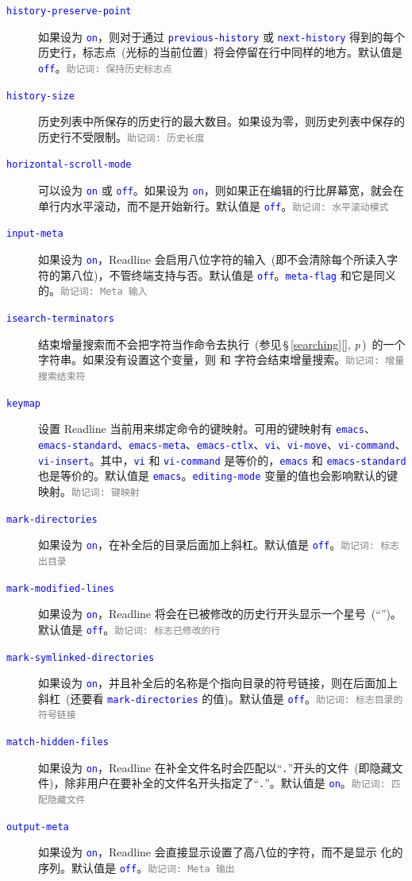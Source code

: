 \documentclass[openany,notitlepage]{book}
\newcommand{\mnemonic}[1]{\textcolor{gray}{{\scriptsize\tt 助记词: #1}}}
\newcommand{\code}[1]{\textcolor{blue}{{\tt #1}}}
\newcommand{\fullref}[1]{\,\S\,\ref{#1}[\nameref{#1}], \textit{p\pageref{#1}}\,}
\begin{document}
\begin{CJK}{UTF8}{song}
\begin{description}
\item[\code{history-preserve-point}] 如果设为 \code{on}，则对于通过 \code{previous-history} 或 \code{next-history} 得到的每个历史行，标志点~(光标的当前位置)~将会停留在行中同样的地方。默认值是 \code{off}。\mnemonic{保持历史标志点}
\item[\code{history-size}] 历史列表中所保存的历史行的最大数目。如果设为零，则历史列表中保存的历史行不受限制。\mnemonic{历史长度}
\item[\code{horizontal-scroll-mode}] 可以设为 \code{on} 或 \code{off}。如果设为 \code{on}，则如果正在编辑的行比屏幕宽，就会在单行内水平滚动，而不是开始新行。默认值是 \code{off}。\mnemonic{水平滚动模式}
\item[\code{input-meta}] 如果设为 \code{on}，Readline 会启用八位字符的输入~(即不会清除每个所读入字符的第八位)，不管终端支持与否。默认值是 \code{off}。\code{meta-flag} 和它是同义的。\mnemonic{Meta 输入}
\item[\code{isearch-terminators}] 结束增量搜索而不会把字符当作命令去执行~(参见\fullref{searching})~的一个字符串。如果没有设置这个变量，则  和  字符会结束增量搜索。\mnemonic{增量搜索结束符}
\item[\code{keymap}] 设置 Readline 当前用来绑定命令的键映射。可用的键映射有 \code{emacs}、\code{emacs-standard}、\code{emacs-meta}、\code{emacs-ctlx}、\code{vi}、\code{vi-move}、\code{vi-command}、\code{vi-insert}。其中，\code{vi} 和 \code{vi-command} 是等价的，\code{emacs} 和 \code{emacs-standard} 也是等价的。默认值是 \code{emacs}。\code{editing-mode} 变量的值也会影响默认的键映射。\mnemonic{键映射}
\item[\code{mark-directories}] 如果设为 \code{on}，在补全后的目录后面加上斜杠。默认值是 \code{off}。\mnemonic{标志出目录}
\item[\code{mark-modified-lines}] 如果设为 \code{on}，Readline 将会在已被修改的历史行开头显示一个星号~(``\code{*}'')。默认值是 \code{off}。\mnemonic{标志已修改的行}
\item[\code{mark-symlinked-directories}] 如果设为 \code{on}，并且补全后的名称是个指向目录的符号链接，则在后面加上斜杠~(还要看 \code{mark-directories} 的值)。默认值是 \code{off}。\mnemonic{标志目录的符号链接}
\item[\code{match-hidden-files}] 如果设为 \code{on}，Readline 在补全文件名时会匹配以``\code{.}''开头的文件~(即隐藏文件)，除非用户在要补全的文件名开头指定了``\code{.}''。默认值是 \code{on}。\mnemonic{匹配隐藏文件}
\item[\code{output-meta}] 如果设为 \code{on}，Readline 会直接显示设置了高八位的字符，而不是显示  化的序列。默认值是 \code{off}。\mnemonic{Meta 输出}

\end{description}
\end{CJK}
\end{document}
